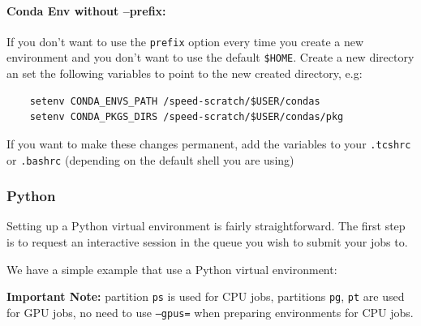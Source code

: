\documentclass{easychair}
\begin{document}
\paragraph{Conda Env without --prefix: }

If you don't want to use the \texttt{\-\-prefix} option every time you create a new environment and you don't want to use the default \texttt{\-\$HOME}.
Create a new directory an set the following variables to point to the new created directory, e.g:
\begin{verbatim}
	setenv CONDA_ENVS_PATH /speed-scratch/$USER/condas
	setenv CONDA_PKGS_DIRS /speed-scratch/$USER/condas/pkg
\end{verbatim}
If you want to make these changes permanent, add the variables to your \texttt{.tcshrc} or \texttt{.bashrc} (depending on the default shell you are using)

\subsubsection{Python}
\label{sect:python-venv}

Setting up a Python virtual environment is fairly straightforward.
The first step is to request an interactive session in the queue you wish to submit your jobs to.

We have a simple example that use a Python virtual environment:


\noindent
\textbf{Important Note:} partition \texttt{ps} is used for CPU jobs, partitions \texttt{pg}, \texttt{pt} are used
for GPU jobs, no need to use \texttt{--gpus=} when preparing environments for CPU jobs.
\end{document}
